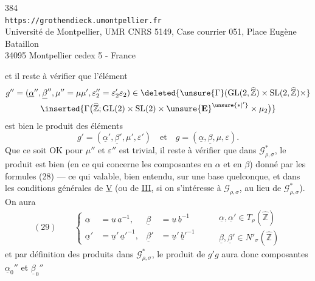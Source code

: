 \begin{center}
384\\
\texttt{https://grothendieck.umontpellier.fr}\\
Université de Montpellier, UMR CNRS 5149, Case courrier 051, Place Eugène Bataillon\\
34095 Montpellier cedex 5 - France
\end{center}

et il reste à vérifier que l'élément
\[
\begin{gathered}
g''=(\underline\alpha'',\underline\beta'',\mu''=\mu\mu',\varepsilon_2''=\varepsilon_2'\varepsilon_2)
\in\deleted{\unsure{\Gamma}(\mathrm{GL}(2,\widehat{\mathbb Z})\times\mathrm{SL}(2,\widehat{\mathbb Z})\times}\\
\inserted{\Gamma\bigl(\widehat{\mathbb Z};\mathrm{GL}(2)\times\mathrm{SL}(2)\times\unsure{\mathbf E}^{\unsure{*|'}}\times\mu_2\bigr)}
\end{gathered}
\]
est bien le produit des éléments
\[
g'=(\underline\alpha',\underline\beta',\mu',\varepsilon')\quad\text{et}\quad
g=(\underline\alpha,\underline\beta,\mu,\varepsilon).
\]
Que ce soit OK pour $\mu''$ et $\varepsilon''$ est trivial, il reste à vérifier que dans $\mathcal G_{\rho,\sigma}^{*}$, le produit est bien (en ce qui concerne les composantes en $\alpha$ et en $\beta$) donné par les formules (28) --- ce qui  valable, bien entendu, sur une base quelconque, et dans les conditions générales de \uline{V} (ou  de \uline{III}, si on s'intéresse à $\mathcal G_{\rho,\sigma}$, au lieu de $\mathcal G_{\rho,\sigma}^{*}$). On aura
\[
(29)\qquad
\left\{\begin{aligned}
\underline\alpha&=\underline u\,\underline a^{-1},&
\underline\beta&=\underline u\,\underline b^{-1}\\
\underline\alpha'&=\underline u'\,\underline a'^{-1},&
\underline\beta'&=\underline u'\,\underline b'^{-1}
\end{aligned}\right.
\qquad
\begin{gathered}
\underline\alpha,\underline\alpha'\in T_\rho(\widehat{\mathbb Z})\\
\underline\beta,\underline\beta'\in N'_\sigma(\widehat{\mathbb Z})
\end{gathered}
\]
et par définition des produits dans $\mathcal G_{\rho,\sigma}^{*}$, le produit de  $g'g$ aura donc composantes $\underline\alpha_0''$ et $\underline\beta_0''$
